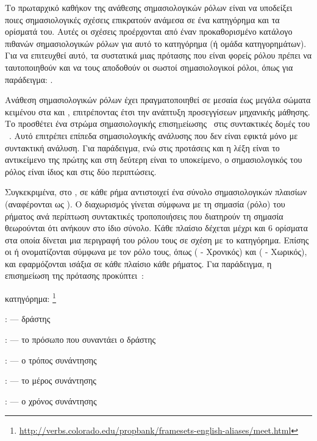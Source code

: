 Το πρωταρχικό καθήκον της ανάθεσης σημασιολογικών ρόλων είναι να υποδείξει ποιες σημασιολογικές σχέσεις επικρατούν ανάμεσα σε ένα κατηγόρημα και τα ορίσματά του.
Αυτές οι σχέσεις προέρχονται από έναν προκαθορισμένο κατάλογο πιθανών σημασιολογικών ρόλων για αυτό το κατηγόρημα (ή ομάδα κατηγορημάτων).
Για να επιτευχθεί αυτό, τα συστατικά μιας πρότασης που είναι φορείς ρόλου πρέπει να ταυτοποιηθούν και να τους αποδοθούν οι σωστοί σημασιολογικοί ρόλοι, όπως για παράδειγμα:
.

Ανάθεση σημασιολογικών ρόλων έχει πραγματοποιηθεί σε μεσαία έως μεγάλα σώματα κειμένου στα  και , επιτρέποντας έτσι την ανάπτυξη προσεγγίσεων μηχανικής μάθησης.
Το  προσθέτει ένα στρώμα σημασιολογικής επισηµείωσης~\cite{kingsbury2002adding} στις συντακτικές δοµές του ~\cite{penntreebank}.
Αυτό επιτρέπει επίπεδα σημασιολογικής ανάλυσης που δεν είναι εφικτά μόνο με συντακτική ανάλυση.
Για παράδειγμα, ενώ στις προτάσεις  και 
η λέξη  είναι το αντικείμενο της πρώτης και στη δεύτερη είναι το υποκείμενο, ο σημασιολογικός του ρόλος είναι ίδιος και στις δύο περιπτώσεις.

Συγκεκριμένα, στο , σε κάθε ρήμα αντιστοιχεί ένα σύνολο σημασιολογικών πλαισίων (αναφέρονται ως ).
Ο διαχωρισμός γίνεται σύμφωνα με τη σημασία (ρόλο) του ρήματος ανά περίπτωση\anoteleia{} συντακτικές τροποποιήσεις που διατηρούν τη σημασία θεωρούνται ότι ανήκουν στο ίδιο σύνολο.
Κάθε πλαίσιο δέχεται μέχρι και 6 ορίσματα \ARGs{} στα οποία δίνεται μια περιγραφή του ρόλου τους σε σχέση με το κατηγόρημα.
Επίσης οι  ή  ονοματίζονται σύμφωνα με τον ρόλο τους,
όπως  ( - Χρονικός) και  ( - Χωρικός),
και εφαρμόζονται ισάξια σε κάθε πλαίσιο κάθε ρήματος.
Για παράδειγμα, η επισημείωση της πρότασης  προκύπτει~\cite{propbank2015guidelines}:
\begin{compactitem}
    \item κατηγόρημα: \footnote{\url{http://verbs.colorado.edu/propbank/framesets-english-aliases/meet.html}}
    \item {}:  --- δράστης
    \item {}:  --- το πρόσωπο που συναντάει ο δράστης
    \item {}:  --- ο τρόπος συνάντησης
    \item {}:  --- το μέρος συνάντησης
    \item {}:  --- ο χρόνος συνάντησης
\end{compactitem}

